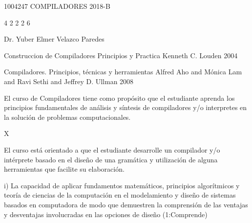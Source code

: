 \documentclass[12pt]{article}
\begin{document}
\sylabusHeader
\sylabusTitle

\curso
{1004247} %
{COMPILADORES} %
{2018-B} %

\creditosHoras
{4} %
{2} %
{2} %
{2} %
{} %
{6} %

\instructor
{Dr. Yuber Elmer Velazco Paredes}

\libro
{Construccion de Compiladores Principios y Practica} %
{Kenneth C. Louden} %
{2004} %

\libroSecundario
{Compiladores. Principios, técnicas y herramientas} %
{Alfred Aho and Mónica Lam and Ravi Sethi and Jeffrey D. Ullman} %
{2008} %

\begin{datosCurso}
    \begin{descripcion}
        El curso de Compiladores tiene como propósito que el estudiante aprenda los principios fundamentales de análisis y síntesis de compiladores y/o interpretes en la solución de problemas computacionales.
        
    \end{descripcion}
    \begin{requisitos}
        
    \end{requisitos}
    \ObligatorioElectivo
    {X} %
    {} %
\end{datosCurso}

\begin{objetivosCurso}
    \begin{resultadosEspecificos}
        El  curso  está orientado a que el estudiante desarrolle un compilador y/o intérprete basado en el diseño de una gramática y utilización de alguna herramientas que facilite su elaboración.
    \end{resultadosEspecificos}
    \begin{resultadosEstudiante}
        i) La capacidad de aplicar fundamentos matemáticos, principios algorítmicos y teoría de ciencias de la computación en el modelamiento y diseño de sistemas basados en computadora de modo que demuestren la comprensión de las ventajas y desventajas involucradas en las opciones de diseño (1:Comprende)
    \end{resultadosEstudiante}
\end{objetivosCurso}

\begin{ListaTemas}
\end{ListaTemas}
\end{document}
